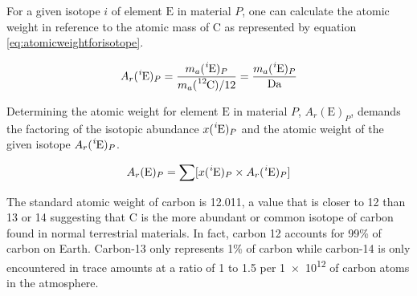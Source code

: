 For a given isotope $i$ of element $\mathrm E$ in material $P$, one can
calculate the atomic weight in reference to the atomic mass of C
as represented by equation \ref{eq:atomicweightforisotope}.

\begin{equation}\label{eq:atomicweightforisotope}
  A_r(\mathrm { \ce{^i}E })_P =
  \frac{ m_a(\mathrm { \ce{^i}E })_P }{ m_a(\mathrm { \ce{^{12}}C })/12 } =
  \frac{ m_a(\mathrm { \ce{^i}E })_P }{ \si{\dalton} }
\end{equation}

Determining the atomic weight for element $\mathrm E$ in material $P$,
$A_r(\mathrm E)_P$, demands the factoring of the isotopic abundance
$x(\mathrm { \ce{^{i}E} })_P$ and the atomic weight of the given isotope
$A_r(\mathrm { \ce{^i}E })_P$.

\begin{equation}\label{eq:atomicweightforelement}
  A_r(\mathrm E)_P =
  \sum [x(\mathrm { \ce{^i}E })_P \times A_r( \mathrm { \ce{^i}E } )_P]
\end{equation}

The standard atomic weight of carbon is \num{12.011}\cite{atomic-weights-2013},
a value that is closer to \num{12} than \num{13} or \num{14} suggesting that
C is the more abundant or common isotope of carbon found in
normal terrestrial materials. In fact, carbon 12 accounts for 99\% of carbon
on Earth. Carbon-13 only represents 1\% of carbon while carbon-14 is only
encountered in trace amounts at a ratio of 1 to 1.5 per \num{1e12} of carbon
atoms in the atmosphere.

